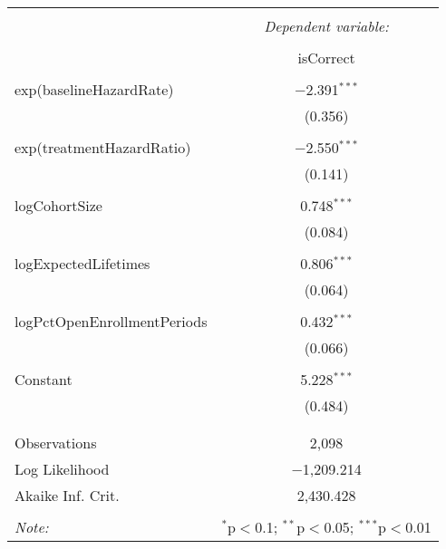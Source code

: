 \begin{table}[!htbp] \centering 
  \caption{} 
  \label{} 
\begin{tabular}{@{\extracolsep{5pt}}lc} 
\\[-1.8ex]\hline 
\hline \\[-1.8ex] 
 & \multicolumn{1}{c}{\textit{Dependent variable:}} \\ 
\cline{2-2} 
\\[-1.8ex] & isCorrect \\ 
\hline \\[-1.8ex] 
 exp(baselineHazardRate) & $-$2.391$^{***}$ \\ 
  & (0.356) \\ 
  & \\ 
 exp(treatmentHazardRatio) & $-$2.550$^{***}$ \\ 
  & (0.141) \\ 
  & \\ 
 logCohortSize & 0.748$^{***}$ \\ 
  & (0.084) \\ 
  & \\ 
 logExpectedLifetimes & 0.806$^{***}$ \\ 
  & (0.064) \\ 
  & \\ 
 logPctOpenEnrollmentPeriods & 0.432$^{***}$ \\ 
  & (0.066) \\ 
  & \\ 
 Constant & 5.228$^{***}$ \\ 
  & (0.484) \\ 
  & \\ 
\hline \\[-1.8ex] 
Observations & 2,098 \\ 
Log Likelihood & $-$1,209.214 \\ 
Akaike Inf. Crit. & 2,430.428 \\ 
\hline 
\hline \\[-1.8ex] 
\textit{Note:}  & \multicolumn{1}{r}{$^{*}$p$<$0.1; $^{**}$p$<$0.05; $^{***}$p$<$0.01} \\ 
\end{tabular} 
\end{table}  
